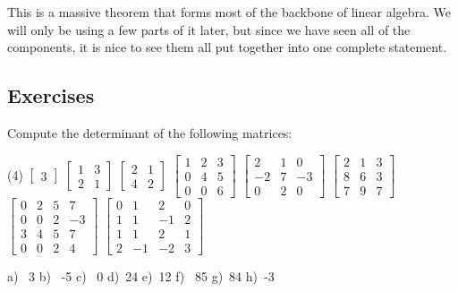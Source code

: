 This is a massive theorem that forms most of the backbone of linear algebra. We will only be using a few parts of it later, but since we have seen all of the components, it is nice to see them all put together into one complete statement.

\subsection{Exercises}

\begin{exercise}
Compute the determinant of the following matrices:
\begin{tasks}(4)
\task
$\begin{bmatrix}
3
\end{bmatrix}$
\task
$\begin{bmatrix}
1 & 3 \\
2 & 1
\end{bmatrix}$
\task
$\begin{bmatrix}
2 & 1 \\
4 & 2
\end{bmatrix}$
\task
$\begin{bmatrix}
1 & 2 & 3 \\
0 & 4 & 5 \\
0 & 0 & 6
\end{bmatrix}$
\task
$\begin{bmatrix}
2 & 1 & 0 \\
-2 & 7 & -3 \\
0 & 2 & 0
\end{bmatrix}$
\task
$\begin{bmatrix}
2 & 1 & 3 \\
8 & 6 & 3 \\
7 & 9 & 7
\end{bmatrix}$
\task
$\begin{bmatrix}
0 & 2 & 5 & 7 \\
0 & 0 & 2 & -3 \\
3 & 4 & 5 & 7 \\
0 & 0 & 2 & 4
\end{bmatrix}$
\task
$\begin{bmatrix}
0 &  1 &  2 &  0 \\
1 &  1 & -1 & 2 \\
1 &  1 &  2 & 1 \\
2 & -1 & -2 & 3
\end{bmatrix}$
\end{tasks}
\end{exercise}
\comboSol{%
}
{%
a)~ 3 \quad b)~ -5 \quad c)~ 0 \quad d)~24 \quad e)~12 \quad f)~ 85 \quad g)~84 \quad h)~-3
}

